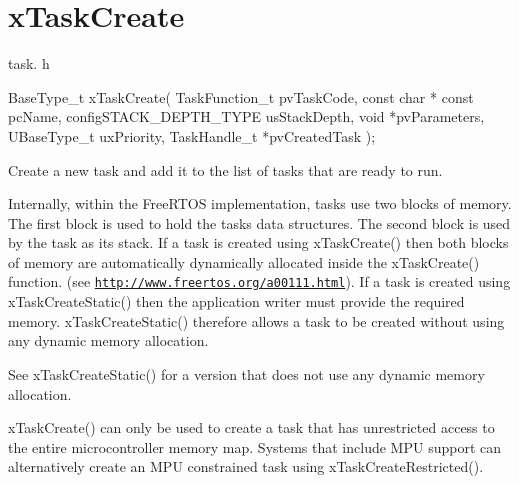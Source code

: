 \hypertarget{group__x_task_create}{}\section{x\+Task\+Create}
\label{group__x_task_create}
task. h 
\begin{DoxyPre}
BaseType\_t xTaskCreate(
                          TaskFunction\_t pvTaskCode,
                          const char * const pcName,
                          configSTACK\_DEPTH\_TYPE usStackDepth,
                          void *pvParameters,
                          UBaseType\_t uxPriority,
                          TaskHandle\_t *pvCreatedTask
                      );\end{DoxyPre}


Create a new task and add it to the list of tasks that are ready to run.

Internally, within the Free\+R\+T\+OS implementation, tasks use two blocks of memory. The first block is used to hold the task\textquotesingle{}s data structures. The second block is used by the task as its stack. If a task is created using x\+Task\+Create() then both blocks of memory are automatically dynamically allocated inside the x\+Task\+Create() function. (see \href{http://www.freertos.org/a00111.html}{\tt http\+://www.\+freertos.\+org/a00111.\+html}). If a task is created using x\+Task\+Create\+Static() then the application writer must provide the required memory. x\+Task\+Create\+Static() therefore allows a task to be created without using any dynamic memory allocation.

See x\+Task\+Create\+Static() for a version that does not use any dynamic memory allocation.

x\+Task\+Create() can only be used to create a task that has unrestricted access to the entire microcontroller memory map. Systems that include M\+PU support can alternatively create an M\+PU constrained task using x\+Task\+Create\+Restricted().


